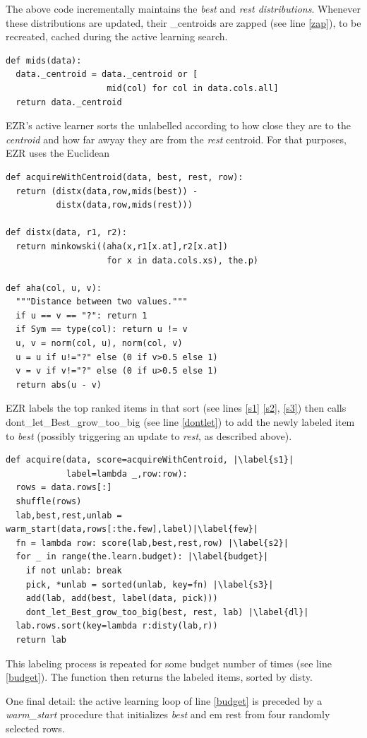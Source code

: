 \documentclass[AMA,STIX2COL]{WileyNJDv5}
\begin{document}
The above code incrementally maintains the {\em best} and {\em rest distributions}.
Whenever these distributions are updated, their \textsf{\_centroids} are zapped
(see line \ref{zap}), to be recreated, cached  during the active learning search. 
\begin{verbatim}
def mids(data): 
  data._centroid = data._centroid or [
                    mid(col) for col in data.cols.all]
  return data._centroid
\end{verbatim}
EZR's active learner sorts  the unlabelled according to how close
they are to the {\em  centroid} and how far awyay they are from the  {\em  rest} centroid. For that purposes, EZR uses the Euclidean 
\begin{verbatim}
def acquireWithCentroid(data, best, rest, row): 
  return (distx(data,row,mids(best)) -
          distx(data,row,mids(rest)))

def distx(data, r1, r2): 
  return minkowski((aha(x,r1[x.at],r2[x.at]) 
                    for x in data.cols.xs), the.p)

def aha(col, u, v):
  """Distance between two values."""
  if u == v == "?": return 1
  if Sym == type(col): return u != v
  u, v = norm(col, u), norm(col, v)
  u = u if u!="?" else (0 if v>0.5 else 1)
  v = v if v!="?" else (0 if u>0.5 else 1)
  return abs(u - v)
\end{verbatim}
EZR labels the top ranked items in that sort (see lines \ref{s1} \ref{s2}, \ref{s3})
then calls \textsf{dont\_let\_Best\_grow\_too\_big} (see line \ref{dontlet})  to add the newly labeled item
to {\em best} (possibly triggering an update to {\em rest}, as described above).
\begin{verbatim}
def acquire(data, score=acquireWithCentroid, |\label{s1}|
            label=lambda _,row:row): 
  rows = data.rows[:]
  shuffle(rows)
  lab,best,rest,unlab = warm_start(data,rows[:the.few],label)|\label{few}|
  fn = lambda row: score(lab,best,rest,row) |\label{s2}|
  for _ in range(the.learn.budget): |\label{budget}|
    if not unlab: break
    pick, *unlab = sorted(unlab, key=fn) |\label{s3}|
    add(lab, add(best, label(data, pick)))
    dont_let_Best_grow_too_big(best, rest, lab) |\label{dl}|
  lab.rows.sort(key=lambda r:disty(lab,r))
  return lab
\end{verbatim}
This labeling process is repeated for some \textsf{budget} number of
times (see line \ref{budget}). The function then returns the labeled
items, sorted by \textsf{disty}.


One final detail: the active learning loop of line \ref{budget} is preceded
by a {\em warm\_start} procedure that initializes {\em best} and {em rest}
from four randomly selected rows.
 
\end{document}
